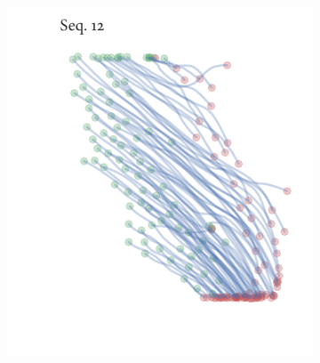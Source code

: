 \begin{figure}[h]
\begin{subfigure}[t]{0.5\textwidth}
	\end{subfigure}%
	\begin{subfigure}[t]{0.5\textwidth}
		\centering
		\includegraphics{sequence12.pdf}
	\end{subfigure}
\end{figure}


